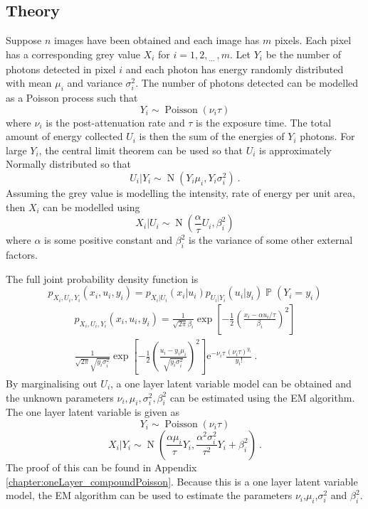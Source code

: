 \documentclass[12pt]{report}
\DeclareMathOperator{\prob}{\mathbb{P}}
\DeclareMathOperator{\normal}{N}
\DeclareMathOperator{\poisson}{Poisson}
\newcommand{\euler}{\mathrm{e}}
\newcommand{\dotdotdot}{_{\phantom{.}\cdots}}
\begin{document}
\subsection{Theory}
Suppose $n$ images have been obtained and each image has $m$ pixels. Each pixel has a corresponding grey value $X_i$ for $i=1,2,\dotdotdot,m$. Let $Y_i$ be the number of photons detected in pixel $i$ and each photon has energy randomly distributed with mean $\mu_i$ and variance $\sigma_i^2$. The number of photons detected can be modelled as a Poisson process such that
\begin{equation}
Y_i\sim\poisson(\nu_i \tau)
\end{equation}
where $\nu_i$ is the post-attenuation rate and $\tau$ is the exposure time. The total amount of energy collected $U_i$ is then the sum of the energies of $Y_i$ photons. For large $Y_i$, the central limit theorem can be used so that $U_i$ is approximately Normally distributed so that
\begin{equation}
U_i|Y_i\sim\normal\left(
Y_i\mu_i,Y_i\sigma_i^2
\right) \ .
\end{equation}
Assuming the grey value is modelling the intensity, rate of energy per unit area, then $X_i$ can be modelled using
\begin{equation}
X_i|U_i\sim\normal\left(
\frac{\alpha}{\tau}U_i,\beta_i^2
\right)
\end{equation}
where $\alpha$ is some positive constant and $\beta_i^2$ is the variance of some other external factors.
 
The full joint probability density function is
\begin{equation*}
p_{X_i,U_i,Y_i}\left(x_i,u_i,y_i\right)=
p_{X_i|U_i}(x_i|u_i)p_{U_i|Y_i}(u_i|y_i)\prob(Y_i=y_i)
\end{equation*}
\begin{multline}
p_{X_i,U_i,Y_i}\left(x_i,u_i,y_i\right)=
\frac{1}{\sqrt{2\pi}\beta_i}\exp\left[-\frac{1}{2}\left(\frac{x_i-\alpha u_i /\tau}{\beta_i}\right)^2\right]
\\
\frac{1}{\sqrt{2\pi}\sqrt{y_i\sigma_i^2}}\exp\left[-\frac{1}{2}\left(\frac{u_i-y_i\mu_i}{\sqrt{y_i\sigma_i^2}}\right)^2\right]
\euler^{-\nu_i\tau}\frac{(\nu_i\tau)^{y_i}}{y_i!} \ .
\end{multline}
By marginalising out $U_i$, a one layer latent variable model can be obtained and the unknown parameters $\nu_i,\mu_i,\sigma_i^2,\beta_i^2$ can be estimated using the EM algorithm. The one layer latent variable is given as
\begin{equation}
Y_i\sim\poisson(\nu_i\tau)
\end{equation}
\begin{equation}
X_i|Y_i\sim\normal\left(
\frac{\alpha\mu_i}{\tau}Y_i,\frac{\alpha^2\sigma_i^2}{\tau^2}Y_i+\beta_i^2
\right) \ .
\end{equation}
The proof of this can be found in Appendix \ref{chapter:oneLayer_compoundPoisson}. Because this is a one layer latent variable model, the EM algorithm can be used to estimate the parameters $\nu_i$,$\mu_i$,$\sigma_i^2$ and $\beta_i^2$.
\end{document}
